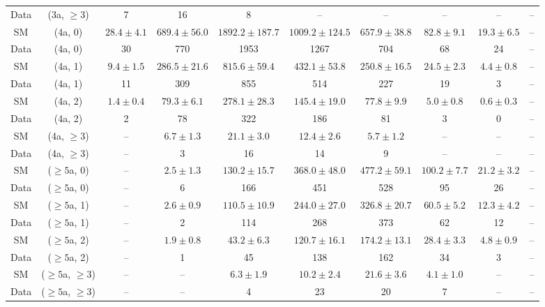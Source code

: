 \begin{table}[h!]
{\begin{tabular}{cccccccccc}
	Data & (3a, $\ge3$) & 7 & 16 & 8 & -- & -- & -- & -- & -- \\[0.5ex] 
	SM & (4a, 0) & $28.4\pm 4.1$ & $689.4\pm 56.0$ & $1892.2\pm 187.7$ & $1009.2\pm 124.5$ & $657.9\pm 38.8$ & $82.8\pm 9.1$ & $19.3\pm 6.5$ & -- \\[0.5ex] 
	Data & (4a, 0) & 30 & 770 & 1953 & 1267 & 704 & 68 & 24 & -- \\[0.5ex] 
	SM & (4a, 1) & $9.4\pm 1.5$ & $286.5\pm 21.6$ & $815.6\pm 59.4$ & $432.1\pm 53.8$ & $250.8\pm 16.5$ & $24.5\pm 2.3$ & $4.4\pm 0.8$ & -- \\[0.5ex] 
	Data & (4a, 1) & 11 & 309 & 855 & 514 & 227 & 19 & 3 & -- \\[0.5ex] 
	SM & (4a, 2) & $1.4\pm 0.4$ & $79.3\pm 6.1$ & $278.1\pm 28.3$ & $145.4\pm 19.0$ & $77.8\pm 9.9$ & $5.0\pm 0.8$ & $0.6\pm 0.3$ & -- \\[0.5ex] 
	Data & (4a, 2) & 2 & 78 & 322 & 186 & 81 & 3 & 0 & -- \\[0.5ex] 
	SM & (4a, $\ge3$) & -- & $6.7\pm 1.3$ & $21.1\pm 3.0$ & $12.4\pm 2.6$ & $5.7\pm 1.2$ & -- & -- & -- \\[0.5ex] 
	Data & (4a, $\ge3$) & -- & 3 & 16 & 14 & 9 & -- & -- & -- \\[0.5ex] 
	SM & ($\ge5$a, 0) & -- & $2.5\pm 1.3$ & $130.2\pm 15.7$ & $368.0\pm 48.0$ & $477.2\pm 59.1$ & $100.2\pm 7.7$ & $21.2\pm 3.2$ & -- \\[0.5ex] 
	Data & ($\ge5$a, 0) & -- & 6 & 166 & 451 & 528 & 95 & 26 & -- \\[0.5ex] 
	SM & ($\ge5$a, 1) & -- & $2.6\pm 0.9$ & $110.5\pm 10.9$ & $244.0\pm 27.0$ & $326.8\pm 20.7$ & $60.5\pm 5.2$ & $12.3\pm 4.2$ & -- \\[0.5ex] 
	Data & ($\ge5$a, 1) & -- & 2 & 114 & 268 & 373 & 62 & 12 & -- \\[0.5ex] 
	SM & ($\ge5$a, 2) & -- & $1.9\pm 0.8$ & $43.2\pm 6.3$ & $120.7\pm 16.1$ & $174.2\pm 13.1$ & $28.4\pm 3.3$ & $4.8\pm 0.9$ & -- \\[0.5ex] 
	Data & ($\ge5$a, 2) & -- & 1 & 45 & 138 & 162 & 34 & 3 & -- \\[0.5ex] 
	SM & ($\ge5$a, $\ge3$) & -- & -- & $6.3\pm 1.9$ & $10.2\pm 2.4$ & $21.6\pm 3.6$ & $4.1\pm 1.0$ & -- & -- \\[0.5ex] 
	Data & ($\ge5$a, $\ge3$) & -- & -- & 4 & 23 & 20 & 7 & -- & -- \\[0.5ex] 
	\hline
	\hline
\end{tabular}}
\end{table}
